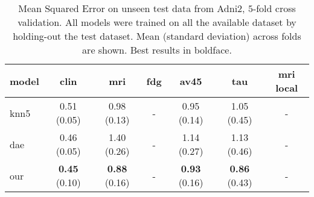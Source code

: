 \begin{table}[!t]
\caption{
Mean Squared Error on unseen test data from Adni2, $5$-fold cross validation.
All models were trained on all the available dataset by holding-out the test dataset.
Mean (standard deviation) across folds are shown. Best results in boldface.
}
\centering
\begin{tabular}{lcccccc}
\toprule
model &         clin &          mri & fdg &         av45 &          tau & mri local \\
\midrule
knn5              &  0.51 (0.05) &  0.98 (0.13) &   - &  0.95 (0.14) &  1.05 (0.45) &          - \\
dae               &  0.46 (0.05) &  1.40 (0.26) &   - &  1.14 (0.27) &  1.13 (0.46) &          - \\
our               &  \textbf{0.45} (0.10) &  \textbf{0.88} (0.16) &   - &  \textbf{0.93} (0.16) &  \textbf{0.86} (0.43) &          - \\
\bottomrule
\end{tabular}
\label{table:model_comparison}
\end{table}
